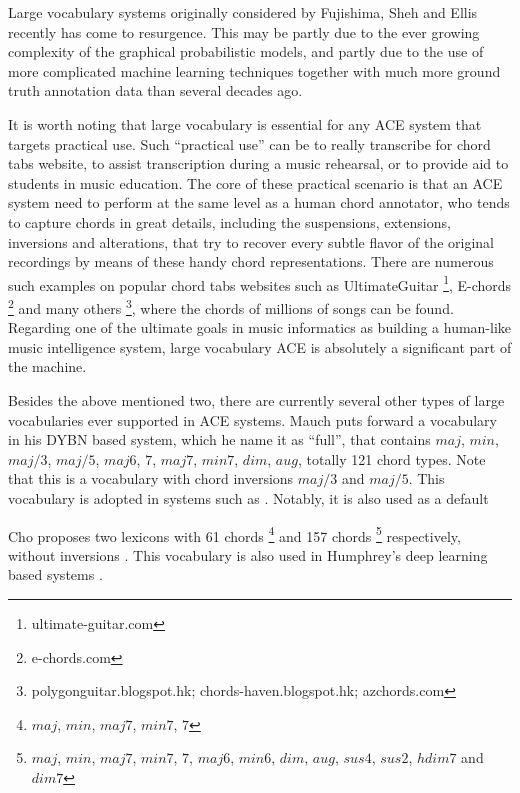  \label{sec:2-largevocab}
Large vocabulary systems originally considered by Fujishima, Sheh and Ellis \cite{fujishima1999realtime,sheh2003chord} recently has come to resurgence. This may be partly due to the ever growing complexity of the graphical probabilistic models, and partly due to the use of more complicated machine learning techniques together with much more ground truth annotation data than several decades ago.

It is worth noting that large vocabulary is essential for any ACE system that targets practical use. Such ``practical use'' can be to really transcribe for chord tabs website, to assist transcription during a music rehearsal, or to provide aid to students in music education. The core of these practical scenario is that an ACE system need to perform at the same level as a human chord annotator, who tends to capture chords in great details, including the suspensions, extensions, inversions and alterations, that try to recover every subtle flavor of the original recordings by means of these handy chord representations. There are numerous such examples on popular chord tabs websites such as UltimateGuitar \footnote{ultimate-guitar.com}, E-chords \footnote{e-chords.com} and many others \footnote{polygonguitar.blogspot.hk; chords-haven.blogspot.hk; azchords.com}, where the chords of millions of songs can be found. Regarding one of the ultimate goals in music informatics as building a human-like music intelligence system, large vocabulary ACE is absolutely a significant part of the machine.

Besides the above mentioned two, there are currently several other types of large vocabularies ever supported in ACE systems. Mauch \cite{mauch2010automatic} puts forward a vocabulary in his DYBN based system, which he name it as ``full'', that contains $maj$, $min$, $maj/3$, $maj/5$, $maj6$, $7$, $maj7$, $min7$, $dim$, $aug$, totally 121 chord types. Note that this is a vocabulary with chord inversions $maj/3$ and $maj/5$. This vocabulary is adopted in systems such as \cite{ni2012end,mcvicar2014automatic,boulanger2013audio}. Notably, it is also used as a default

Cho \cite{cho2014improved} proposes two lexicons with 61 chords \footnote{$maj$, $min$, $maj7$, $min7$, $7$} and 157 chords \footnote{$maj$, $min$, $maj7$, $min7$, $7$, $maj6$, $min6$, $dim$, $aug$, $sus4$, $sus2$, $hdim7$ and $dim7$} respectively, without inversions \cite{burgoyne2014comparative}. This vocabulary is also used in Humphrey's deep learning based systems \cite{humphreyfour,humphrey2015exploration}.

